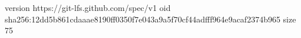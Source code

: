 version https://git-lfs.github.com/spec/v1
oid sha256:12dd5b861cdaaae8190ff0350f7e043a9a5f70cf44adfff964e9acaf2374b965
size 75
